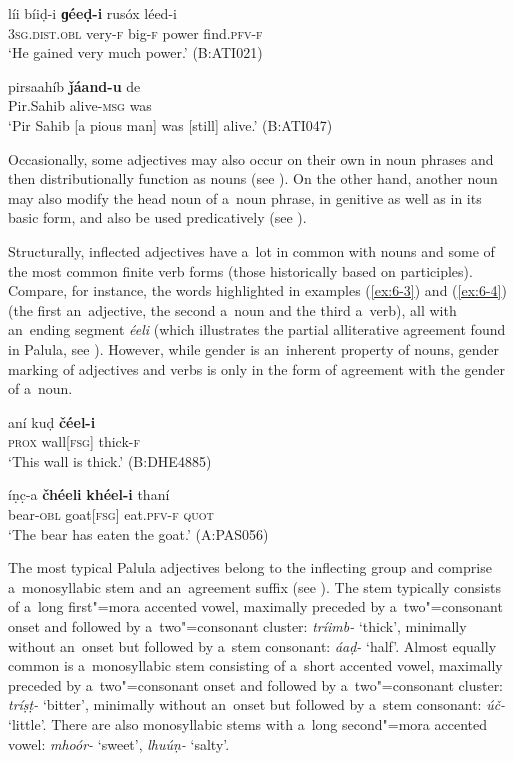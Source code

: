 \begin{exe}
\ex
\label{ex:6-1}
\gll líi bíiḍ-i \textbf{ɡéeḍ-i} rusóx léed-i \\
\textsc{3sg.dist.obl} very-\textsc{f} big-\textsc{f} power find.\textsc{pfv-f} \\
\glt `He gained very much power.' (B:ATI021)

\ex
\label{ex:6-2}
\gll pirsaahíb \textbf{ǰáand-u} de \\
Pir.Sahib alive-\textsc{msg} was  \\
\glt `Pir Sahib [a pious man] was [still] alive.' (B:ATI047)
\end{exe}

Occasionally, some adjectives may also occur on their own in noun phrases and then distributionally function as nouns (see ). On the other hand, another noun may also modify the head noun of a~noun phrase, in genitive as well as in its basic form, and also be used predicatively (see ).


Structurally, inflected adjectives have a~lot in common with nouns and some of the most common finite verb forms (those historically based on participles). Compare, for instance, the words highlighted in examples (\ref{ex:6-3}) and (\ref{ex:6-4}) (the first an~adjective, the second a~noun and the third a~verb), all with an~ending segment \textit{éeli} (which illustrates the partial alliterative agreement found in Palula, see \citealt[87--88]{corbett2006}). However, while gender is an~inherent property of nouns, gender marking of adjectives and verbs is only in the form of agreement with the gender of a~noun. 


\begin{exe}
\ex
\label{ex:6-3}
\gll aní kuḍ \textbf{čéel-i} \\
\textsc{prox} wall[\textsc{fsg}] thick-\textsc{f} \\
\glt `This wall is thick.' (B:DHE4885)

\ex
\label{ex:6-4}
\gll íṇc̣-a \textbf{čhéeli} \textbf{khéel-i} thaní \\
bear-\textsc{obl} goat[\textsc{fsg}] eat.\textsc{pfv-f} \textsc{quot} \\
\glt `The bear has eaten the goat.' (A:PAS056)
\end{exe}


The most typical Palula adjectives belong to the inflecting group and comprise a~monosyllabic stem and an~agreement suffix (see ). The stem typically consists of a~long first"=mora accented vowel, maximally preceded by a~two"=consonant onset and followed by a~two"=consonant cluster: \textit{tríimb-} `thick', minimally without an~onset but followed by a~stem consonant: \textit{áaḍ-} `half'. Almost equally common is a~monosyllabic stem consisting of a~short accented vowel, maximally preceded by a~two"=consonant onset and followed by a~two"=consonant cluster: \textit{tríṣṭ-} `bitter', minimally without an~onset but followed by a~stem consonant: \textit{úč-} `little'. There are also monosyllabic stems with a~long second"=mora accented vowel: \textit{mhoór-} `sweet', \textit{lhuúṇ-} `salty'. 


